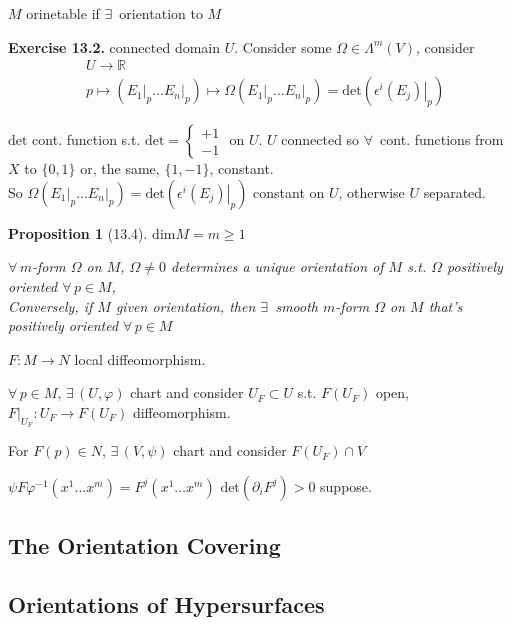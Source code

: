\documentclass[11pt]{amsart}
\newtheorem{proposition}{Proposition}
\theoremstyle{definition}
\newcommand{\exercisehead}[1]{\medskip\noindent\textbf{Exercise #1.} }
\begin{document}
$M$ orinetable if $\exists \, $ orientation to $M$

\exercisehead{13.2}  connected domain $U$.  Consider some $\Omega \in \Lambda^m(V)$,  consider
\[
\begin{aligned}
  & U \to \mathbb{R} \\
  & p \mapsto ( \left. E_1 \right|_p \dots \left. E_n \right|_p ) \mapsto \Omega( \left. E_1 \right|_p \dots \left. E_n \right|_p ) = \text{det}{ ( \left.  \epsilon^i(E_j) \right|_p ) }
\end{aligned}
\]

$\text{det}$ cont. function s.t. $\text{det} = \begin{cases} +1 \\ -1 \end{cases}$ on $U$.  $U$ connected so $\forall \, $ cont. functions from $X$ to $\lbrace 0, 1 \rbrace$ or, the same, $\lbrace 1 , -1 \rbrace$, constant.  \\
So $\Omega( \left. E_1 \right|_p \dots \left. E_n \right|_p ) = \text{det}{ ( \left. \epsilon^i (E_j) \right|_p )}$ constant on $U$, otherwise $U$ separated.

\begin{proposition}[13.4]
$\text{dim}{M} = m \geq 1$

$\forall \, m$-form $\Omega$ on $M$, $\Omega\neq 0$ determines a unique orientation of $M$ s.t. $\Omega$ positively oriented $\forall \, p \in M$, \\
Conversely, if $M$ given orientation, then $\exists \, $ smooth $m$-form $\Omega$ on $M$ that's positively oriented $\forall \, p \in M$
\end{proposition}

$F:M \to N$ local diffeomorphism.

$\forall \, p \in M$, $\exists \, (U, \varphi)$ chart and consider $U_F \subset U$ s.t. $F(U_F)$ open, $\left. F\right|_{U_F} : U_F \to F(U_F)$ diffeomorphism.

For $F(p) \in N$, $\exists \, (V, \psi)$ chart and consider $F(U_F) \cap V$

$\psi F\varphi^{-1}(x^1 \dots x^m) = F^j(x^1 \dots x^m)$ \quad \quad $\text{det}{(\partial_i F^j)} >0$ suppose.


\subsection*{The Orientation Covering}

\subsection*{Orientations of Hypersurfaces }
\end{document}
